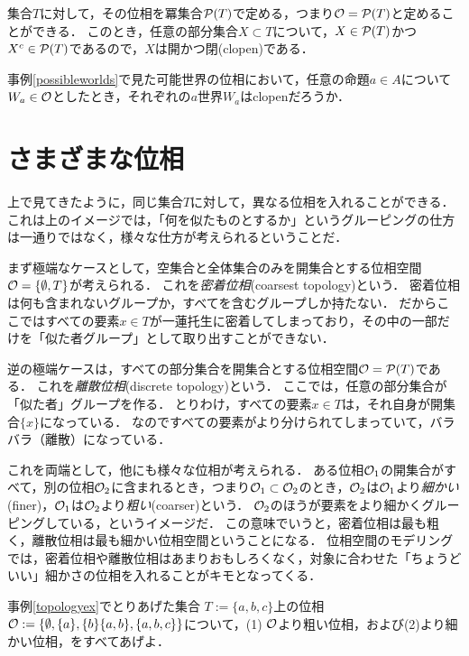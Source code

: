 \documentclass[11pt,a4paper]{jsarticle}
\begin{document}
\begin{example}
 集合$T$に対して，その位相を冪集合$\mathcal{P}(T)$で定める，つまり$\mathcal{O} = \mathcal{P}(T)$と定めることができる．
 このとき，任意の部分集合$X \subset T$について，$X \in \mathcal{P}(T)$かつ$X^c \in \mathcal{P}(T)$であるので，$X$は開かつ閉(clopen)である．
\end{example}

\begin{example}
 事例\ref{possibleworlds}で見た可能世界の位相において，任意の命題$a \in A$について$W_a \in \mathcal{O}$としたとき，それぞれの$a$世界$W_a$はclopenだろうか．
\end{example}


\section{さまざまな位相}
上で見てきたように，同じ集合$T$に対して，異なる位相を入れることができる．
これは上のイメージでは，「何を似たものとするか」というグルーピングの仕方は一通りではなく，様々な仕方が考えられるということだ．

まず極端なケースとして，空集合と全体集合のみを開集合とする位相空間$\mathcal{O} = \{\emptyset, T\}$が考えられる．
これを\emph{密着位相}(coarsest topology)という．
密着位相は何も含まれないグループか，すべてを含むグループしか持たない．
だからここではすべての要素$x \in T$が一蓮托生に密着してしまっており，その中の一部だけを「似た者グループ」として取り出すことができない．

逆の極端ケースは，すべての部分集合を開集合とする位相空間$\mathcal{O} = \mathcal{P}(T)$である．
これを\emph{離散位相}(discrete topology)という．
ここでは，任意の部分集合が「似た者」グループを作る．
とりわけ，すべての要素$x \in T$は，それ自身が開集合$\{x\}$になっている．
なのですべての要素がより分けられてしまっていて，バラバラ（離散）になっている．

これを両端として，他にも様々な位相が考えられる．
ある位相$\mathcal{O}_1$の開集合がすべて，別の位相$\mathcal{O}_2$に含まれるとき，つまり$\mathcal{O}_1 \subset \mathcal{O}_2$のとき，$\mathcal{O}_2$は$\mathcal{O}_1$より\emph{細かい}(finer)，$\mathcal{O}_1$は$\mathcal{O}_2$より\emph{粗い}(coarser)という．
$\mathcal{O}_2$のほうが要素をより細かくグルーピングしている，というイメージだ．
この意味でいうと，密着位相は最も粗く，離散位相は最も細かい位相空間ということになる．
位相空間のモデリングでは，密着位相や離散位相はあまりおもしろくなく，対象に合わせた「ちょうどいい」細かさの位相を入れることがキモとなってくる．

\begin{exercise}
事例\ref{topologyex}でとりあげた集合 $T:=\{a, b, c\}$上の位相$\mathcal{O} := \{ \emptyset, \{a \}, \{b\} \{a,b\}, \{a,b,c\} \}$について，(1) $\mathcal{O}$より粗い位相，および(2)より細かい位相，をすべてあげよ．
\end{exercise}
\end{document}
